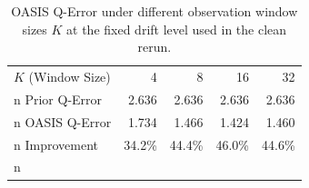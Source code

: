 \begin{table}[t]
  \centering
  \caption{OASIS Q-Error under different observation window sizes $K$ at the fixed drift level used in the clean rerun.}
  \label{tab:sensitivity}
  \begin{tabular}{l r r r r}
    \toprule
    $K$ (Window Size) & 4 & 8 & 16 & 32 \\n    \midrule
    Prior Q-Error & 2.636 & 2.636 & 2.636 & 2.636 \\n    OASIS Q-Error & 1.734 & 1.466 & 1.424 & 1.460 \\n    Improvement & 34.2\% & 44.4\% & 46.0\% & 44.6\% \\n    \bottomrule
  \end{tabular}
\end{table}
